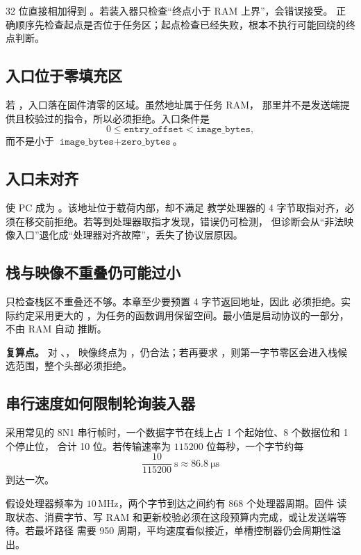32 位直接相加得到 。若装入器只检查“终点小于 RAM 上界”，会错误接受。
正确顺序先检查起点是否位于任务区；起点检查已经失败，根本不执行可能回绕的终点判断。

\subsection{入口位于零填充区}

若 ，入口落在固件清零的区域。虽然地址属于任务 RAM，
那里并不是发送端提供且校验过的指令，所以必须拒绝。入口条件是
\[
0\le\texttt{entry\_offset}<\texttt{image\_bytes},
\]
而不是小于 \(\texttt{image\_bytes}+\texttt{zero\_bytes}\)。

\subsection{入口未对齐}

 使 PC 成为 。该地址位于载荷内部，却不满足
教学处理器的 4 字节取指对齐，必须在移交前拒绝。若等到处理器取指才发现，错误仍可检测，
但诊断会从“非法映像入口”退化成“处理器对齐故障”，丢失了协议层原因。

\subsection{栈与映像不重叠仍可能过小}

只检查栈区不重叠还不够。本章至少要预置 4 字节返回地址，因此
 必须拒绝。实际约定采用更大的
，为任务的函数调用保留空间。最小值是启动协议的一部分，不由 RAM 自动
推断。

\begin{problemframe}
\textbf{复算点。} 对
、，
映像终点为 ，仍合法；若再要求
，则第一字节零区会进入栈候选范围，整个头部必须拒绝。
\end{problemframe}

\subsection{串行速度如何限制轮询装入器}

采用常见的 8N1 串行帧时，一个数据字节在线上占 1 个起始位、8 个数据位和 1 个停止位，
合计 10 位。若传输速率为 \(115200\) 位每秒，一个字节约每
\[
\frac{10}{115200}\ \mathrm{s}\approx86.8\ \mathrm{\mu s}
\]
到达一次。

假设处理器频率为 \(10\,\mathrm{MHz}\)，两个字节到达之间约有 868 个处理器周期。固件
读取状态、消费字节、写 RAM 和更新校验必须在这段预算内完成，或让发送端等待。若最坏路径
需要 950 周期，平均速度看似接近，单槽控制器仍会周期性溢出。

